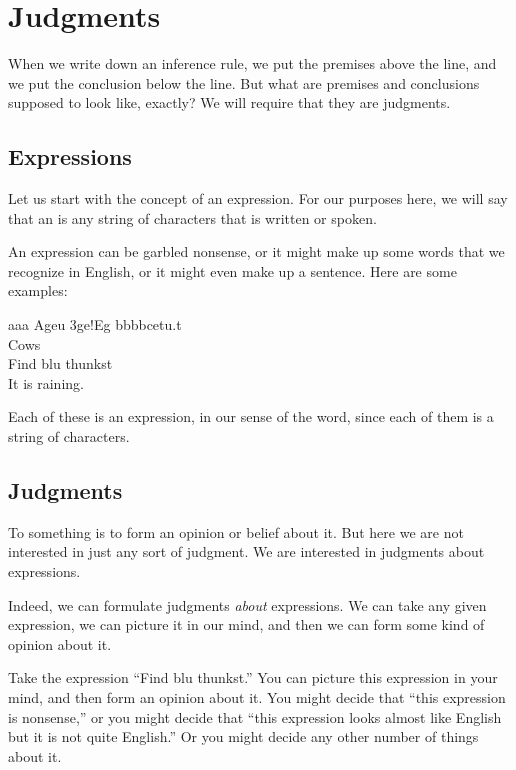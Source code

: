 \documentclass[../../../main.tex]{subfiles}
\begin{document}
\chapter{Judgments}

When we write down an inference rule, we put the premises above the line, and we put the conclusion below the line. But what are premises and conclusions supposed to look like, exactly? We will require that they are judgments.


\section{Expressions}

Let us start with the concept of an expression. For our purposes here, we will say that an  is any string of characters that is written or spoken. 

An expression can be garbled nonsense, or it might make up some words that we recognize in English, or it might even make up a sentence. Here are some examples:

\begin{center}
  aaa
  Ageu 3ge!Eg bbbbcetu.t \\
  Cows \\
  Find blu thunkst \\
  It is raining.
\end{center}

\noindent
Each of these is an expression, in our sense of the word, since each of them is a string of characters.


\section{Judgments}

To  something is to form an opinion or belief about it. But here we are not interested in just any sort of judgment. We are interested in judgments about expressions. 

Indeed, we can formulate judgments \emph{about} expressions. We can take any given expression, we can picture it in our mind, and then we can form some kind of opinion about it. 

Take the expression ``Find blu thunkst.'' You can picture this expression in your mind, and then form an opinion about it. You might decide that ``this expression is nonsense,'' or you might decide that ``this expression looks almost like English but it is not quite English.'' Or you might decide any other number of things about it.
\end{document}
